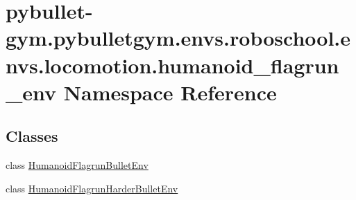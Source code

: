 \hypertarget{namespacepybullet-gym_1_1pybulletgym_1_1envs_1_1roboschool_1_1envs_1_1locomotion_1_1humanoid__flagrun__env}{}\section{pybullet-\/gym.pybulletgym.\+envs.\+roboschool.\+envs.\+locomotion.\+humanoid\+\_\+flagrun\+\_\+env Namespace Reference}
\label{namespacepybullet-gym_1_1pybulletgym_1_1envs_1_1roboschool_1_1envs_1_1locomotion_1_1humanoid__flagrun__env}
\subsection*{Classes}
\begin{DoxyCompactItemize}
\item 
class \hyperlink{classpybullet-gym_1_1pybulletgym_1_1envs_1_1roboschool_1_1envs_1_1locomotion_1_1humanoid__flagru3f2c7cfb3b7b479419ab25a1807bf084}{Humanoid\+Flagrun\+Bullet\+Env}
\item 
class \hyperlink{classpybullet-gym_1_1pybulletgym_1_1envs_1_1roboschool_1_1envs_1_1locomotion_1_1humanoid__flagrudb0b09e2e64c56870b184e16ccd9ae79}{Humanoid\+Flagrun\+Harder\+Bullet\+Env}
\end{DoxyCompactItemize}

